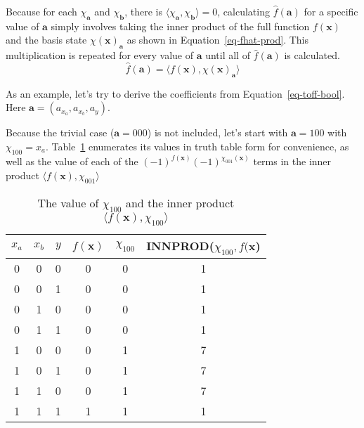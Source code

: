 Because for each $\chi_{\mathbf{a}}$ and $\chi_{\mathbf{b}}$, there is
$\langle \chi_{\mathbf{a}}, \chi_{\mathbf{b}} \rangle = 0$, calculating $\hat{f}(\mathbf{a})$ for a specific
value of $\mathbf{a}$ simply involves taking the inner product of the full function $f(\mathbf{x})$ and the
basis state $\chi(\mathbf{x})_{\mathbf{a}}$ as shown in Equation~\ref{eq-fhat-prod}. This multiplication is
repeated for every value of $\mathbf{a}$ until all of $\hat{f}(\mathbf{a})$ is calculated.
\begin{equation}
  \label{eq-fhat-prod}
  \hat{f}(\mathbf{a}) = \langle f(\mathbf{x}), \chi(\mathbf{x})_{\mathbf{a}} \rangle
\end{equation}

\begin{example}
  As an example, let's try to derive the coefficients from Equation~\ref{eq-toff-bool}. Here
  $\mathbf{a} = (a_{x_a}, a_{x_b}, a_y)$.

  Because the trivial case ($\mathbf{a}= 000$) is not included, let's start with $\mathbf{a} = 100$ with
  $\chi_{100} = x_a$.
  Table~\ref{table-ex-100} enumerates its values in truth table form for convenience, as well as the
  value of each of the $(-1)^{f(\mathbf{x})} (-1)^{\chi_{001}(\mathbf{x})}$ terms in the inner product
  $\langle f(\mathbf{x}), \chi_{001} \rangle$

  \begin{table}[h]
    \begin{center}
      \begin{tabular}{c|c|c|c|c|c}
        \hline
        $x_a$ & $x_b$ & $y$ & $f(\mathbf{x})$ & $\chi_{100}$ & INNPROD($\chi_{100},f(\mathbf{x}$) \\\hline
        0 & 0 & 0 & 0 & 0 & 1\\\hline
        0 & 0 & 1 & 0 & 0 & 1\\\hline
        0 & 1 & 0 & 0 & 0 & 1\\\hline
        0 & 1 & 1 & 0 & 0 & 1\\\hline
        1 & 0 & 0 & 0 & 1 & 7\\\hline
        1 & 0 & 1 & 0 & 1 & 7\\\hline
        1 & 1 & 0 & 0 & 1 & 7\\\hline      
        1 & 1 & 1 & 1 & 1 & 1\\\hline
      \end{tabular}
      \caption{The value of $\chi_{100}$ and the inner product $\langle f(\mathbf{x}), \chi_{100} \rangle$}
      \label{table-ex-100}
    \end{center}
  \end{table}


\end{example}
